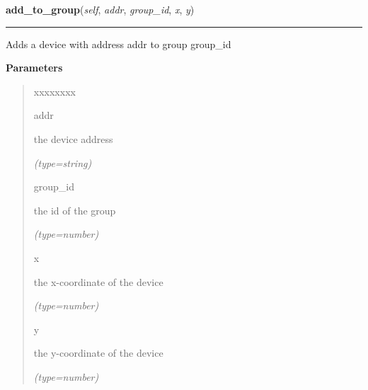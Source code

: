 \hspace{.8\funcindent}\begin{boxedminipage}{\funcwidth}

    \raggedright \textbf{add\_to\_group}(\textit{self}, \textit{addr}, \textit{group\_id}, \textit{x}, \textit{y})

    \vspace{-1.5ex}

    \rule{\textwidth}{0.5\fboxrule}
\setlength{\parskip}{2ex}
    Adds a device with address addr to group group\_id

\setlength{\parskip}{1ex}
      \textbf{Parameters}
      \vspace{-1ex}

      \begin{quote}
        \begin{Ventry}{xxxxxxxx}

          \item[addr]

          the device address

            {\it (type=string)}

          \item[group\_id]

          the id of the group

            {\it (type=number)}

          \item[x]

          the x-coordinate of the device

            {\it (type=number)}

          \item[y]

          the y-coordinate of the device

            {\it (type=number)}

        \end{Ventry}

      \end{quote}

    \end{boxedminipage}

    \label{DBE:DBE:get_active_chips}

    \vspace{0.5ex}

